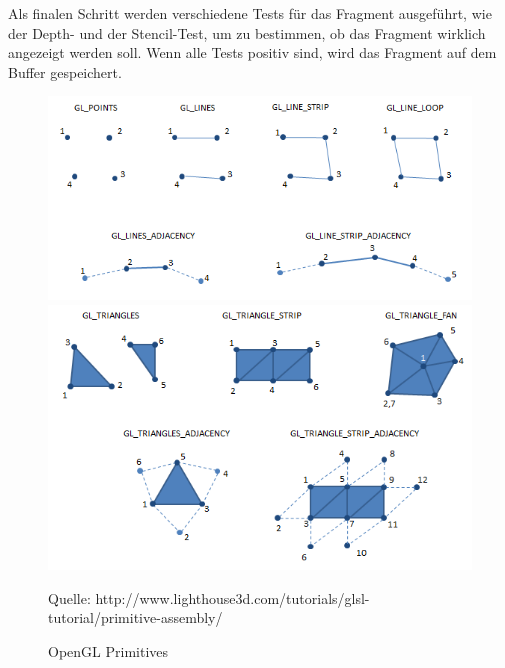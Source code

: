 Als finalen Schritt werden verschiedene Tests für das Fragment ausgeführt, wie der Depth- und der Stencil-Test, um zu bestimmen, ob das Fragment wirklich angezeigt werden soll. Wenn alle Tests positiv sind, wird das Fragment auf dem Buffer gespeichert.
\begin{figure}
	\centering
	\includegraphics[scale=0.7]{02theorie/openglPrimitives.png}
	\includegraphics[scale=0.7]{02theorie/openglPrimitives2.png}
	
	
	Quelle: http://www.lighthouse3d.com/tutorials/glsl-tutorial/primitive-assembly/
	\caption{OpenGL Primitives}\label{OpenGLPrimitives}
\end{figure}


